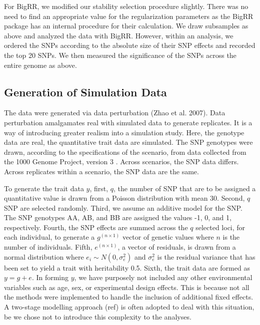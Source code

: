 \documentclass{nature}
\begin{document}
For BigRR, we modified our stability selection procedure slightly. 
There was no need to find an appropriate value for the regularization 
parameters as the BigRR package has an internal procedure for their 
calculation. We draw subsamples as above and analyzed the data with BigRR. However, within an analysis, we ordered 
the SNPs according to the absolute size of their SNP effects and recorded the top 20 SNPs. We then measured the significance 
of the SNPs across the entire genome as above. 



\subsection{Generation of Simulation Data}

The data were generated via data perturbation (Zhao et al. 2007). Data perturbation amalgamates real with simulated data to generate replicates. 
It is a way of introducing greater realism into a simulation study. 
 Here, the genotype data are real, the 
quantitative trait data are simulated. 
 The SNP genotypes were drawn, 
according to the specifications of the scenario, from data collected from the 1000 Genome Project, version 3   \cite{10002010map}. 
Across scenarios, the SNP data differs. Across replicates within a scenario, the SNP data are the same. 

To generate the trait data $y$, first, $q$, the number of SNP that are to be assigned a quantitative value is drawn from a Poisson distribution with 
mean 30. Second, $q$ SNP are selected randomly. Third, we assume an additive model for the SNP. The SNP genotypes AA, AB, and BB 
are assigned the values -1, 0, and 1, respectively. Fourth, the SNP effects are summed across the $q$ selected loci, for each individual, to 
generate a $g^{(n \times 1)}$ vector of genetic values where $n$ is the number of individuals. 
Fifth, $e^{(n \times 1)}$, a vector of residuals, is drawn from a normal distribution where $e_i \sim N(0, \sigma^2_e)$ and $\sigma^2_e$ is 
the residual variance that has been set to yield a trait with heritability 0.5. Sixth,  the trait data are formed as $y =  g + e$.  
In forming $y$, we have purposely not included any other environmental variables such as age, sex, or experimental design effects. This is because 
not all the methods were implemented to handle the inclusion of additional fixed effects. A two-stage modelling approach (ref) 
is often adopted to deal with this situation, be we chose not to introduce this complexity to the analyses.  
\end{document}
